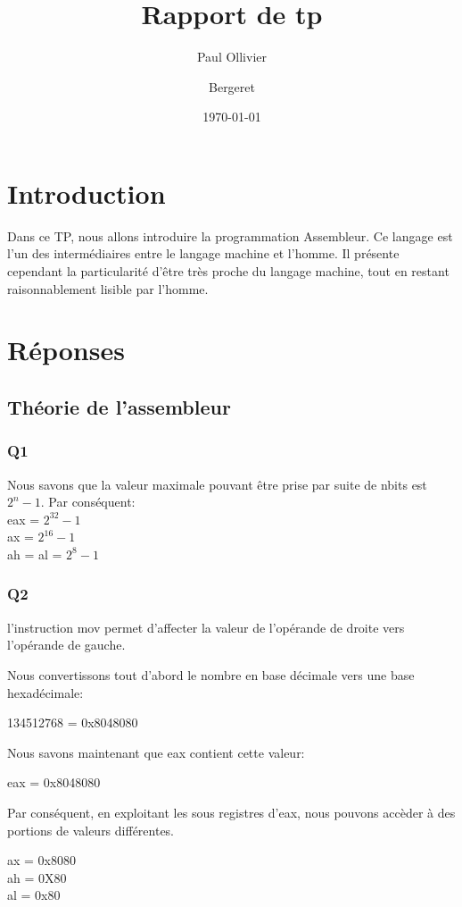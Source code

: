 \documentclass[12pt,a4paper,oneside]{article}
\title{Rapport de tp}
\author{Paul Ollivier \and Bergeret}
\date{\today}
\begin{document}
\maketitle
\newpage
\tableofcontents
\newpage
\section{Introduction}

Dans ce TP, nous allons introduire la programmation Assembleur. Ce langage est l'un des intermédiaires entre le langage machine et l'homme. Il présente cependant la particularité d'être très proche du langage machine, tout en restant raisonnablement lisible par l'homme.

\newpage
\section{Réponses}
\subsection{Théorie de l'assembleur}
\subsubsection{Q1} 
Nous savons que la valeur maximale pouvant être prise par suite de nbits est $2^{n}-1$. Par conséquent:\\
eax = $2^{32}-1$\\
ax = $2^{16}-1$\\
ah = al = $2^{8}-1$\\


\subsubsection{Q2}
l'instruction mov permet d'affecter la valeur de l'opérande de droite vers l'opérande de gauche.

Nous convertissons tout d'abord le nombre en base décimale vers une base hexadécimale:

134512768 = 0x8048080

Nous savons maintenant que eax contient cette valeur:

eax = 0x8048080

Par conséquent, en exploitant les sous registres d'eax, nous pouvons accèder à des portions de valeurs différentes.

ax = 0x8080\\
ah = 0X80\\
al = 0x80\\
\end{document}
